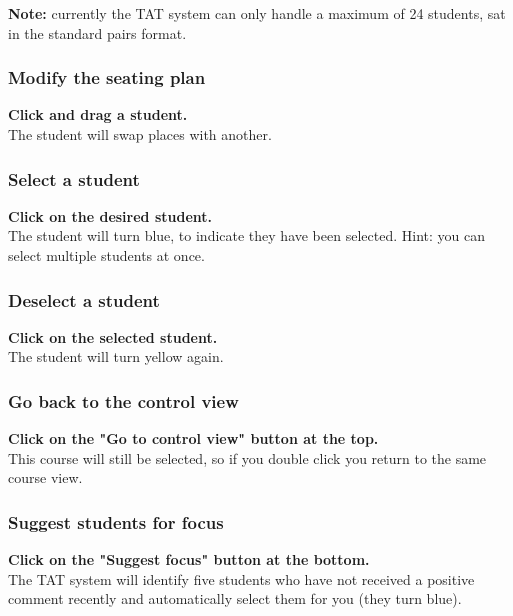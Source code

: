 \documentclass[10pt]{article}
\begin{document}
\textbf{Note:} currently the TAT system can only handle a maximum of 24 students, sat in the standard pairs format.

\subsubsection{Modify the seating plan}
\textbf{Click and drag a student.} \\
The student will swap places with another.

\subsubsection{Select a student}
\textbf{Click on the desired student.} \\
The student will turn blue, to indicate they have been selected. Hint: you can select multiple students at once.

\subsubsection{Deselect a student}
\textbf{Click on the selected student.} \\
The student will turn yellow again. 

\subsubsection{Go back to the control view}
\textbf{Click on the "Go to control view" button at the top.} \\
This course will still be selected, so if you double click you return to the same course view.

\subsubsection{Suggest students for focus}
\textbf{Click on the "Suggest focus" button at the bottom.} \\
The TAT system will identify five students who have not received a positive comment recently and automatically select them for you (they turn blue). 
\end{document}
